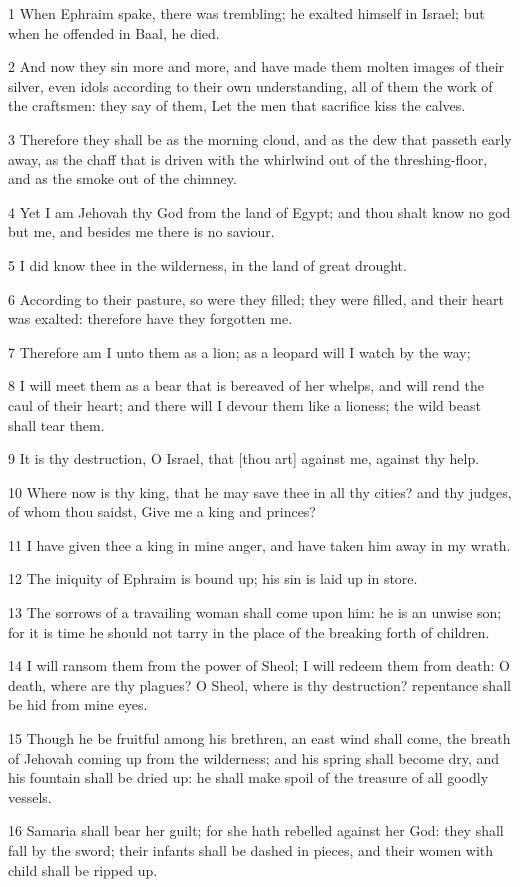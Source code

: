 \par 1 When Ephraim spake, there was trembling; he exalted himself in Israel; but when he offended in Baal, he died.
\par 2 And now they sin more and more, and have made them molten images of their silver, even idols according to their own understanding, all of them the work of the craftsmen: they say of them, Let the men that sacrifice kiss the calves.
\par 3 Therefore they shall be as the morning cloud, and as the dew that passeth early away, as the chaff that is driven with the whirlwind out of the threshing-floor, and as the smoke out of the chimney.
\par 4 Yet I am Jehovah thy God from the land of Egypt; and thou shalt know no god but me, and besides me there is no saviour.
\par 5 I did know thee in the wilderness, in the land of great drought.
\par 6 According to their pasture, so were they filled; they were filled, and their heart was exalted: therefore have they forgotten me.
\par 7 Therefore am I unto them as a lion; as a leopard will I watch by the way;
\par 8 I will meet them as a bear that is bereaved of her whelps, and will rend the caul of their heart; and there will I devour them like a lioness; the wild beast shall tear them.
\par 9 It is thy destruction, O Israel, that [thou art] against me, against thy help.
\par 10 Where now is thy king, that he may save thee in all thy cities? and thy judges, of whom thou saidst, Give me a king and princes?
\par 11 I have given thee a king in mine anger, and have taken him away in my wrath.
\par 12 The iniquity of Ephraim is bound up; his sin is laid up in store.
\par 13 The sorrows of a travailing woman shall come upon him: he is an unwise son; for it is time he should not tarry in the place of the breaking forth of children.
\par 14 I will ransom them from the power of Sheol; I will redeem them from death: O death, where are thy plagues? O Sheol, where is thy destruction? repentance shall be hid from mine eyes.
\par 15 Though he be fruitful among his brethren, an east wind shall come, the breath of Jehovah coming up from the wilderness; and his spring shall become dry, and his fountain shall be dried up: he shall make spoil of the treasure of all goodly vessels.
\par 16 Samaria shall bear her guilt; for she hath rebelled against her God: they shall fall by the sword; their infants shall be dashed in pieces, and their women with child shall be ripped up.

